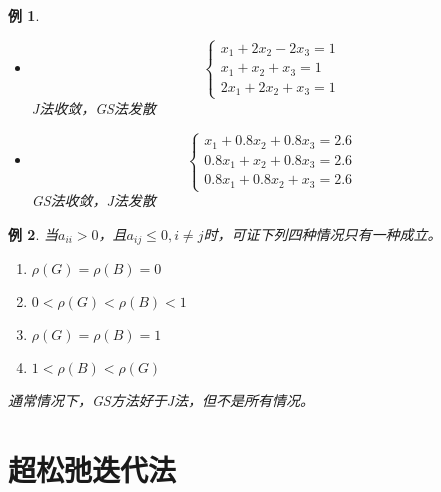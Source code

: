 \documentclass[a4paper]{article}
\newtheorem{example}{例}[section]
\begin{document}
\begin{example}
  \begin{itemize}
    \item $$\left\{
        \begin{array}{lr}
          x_1+2x_2-2x_3 = 1\\
          x_1+x_2+x_3=1 \\
          2x_1+2x_2+x_3 = 1
        \end{array}
      \right.$$J法收敛，GS法发散
    \item $$\left\{
      \begin{array}{lr}
        x_1+0.8x_2+0.8x_3 = 2.6\\
        0.8x_1+x_2+0.8x_3=2.6 \\
        0.8x_1+0.8x_2+x_3 = 2.6
      \end{array}
    \right.$$GS法收敛，J法发散
  \end{itemize}
\end{example}

\begin{example}
  当$a_{ii}>0 $，且$a_{ij}\le 0, i\neq j$时，可证下列四种情况只有一种成立。
  \begin{enumerate}
    \item $\rho(G)=\rho(B)=0$
    \item $0<\rho(G)<\rho(B)<1$
    \item $\rho(G)=\rho(B)=1$
    \item $1<\rho(B)<\rho(G)$
  \end{enumerate}
  通常情况下，GS方法好于J法，但不是所有情况。
\end{example}

\section{超松弛迭代法}
\end{document}
